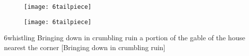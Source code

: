 \begin{a4}
	\begin{figure}[b!]
		\centering
		\texttt{[image: 6tailpiece]}
	\end{figure}
	\clearpage
\end{a4}

\begin{letter}
	\begin{figure}[b!]
		\centering
		\texttt{[image: 6tailpiece]}
	\end{figure}
\end{letter}


\begin{bwbigpic}
	[1.2] 
	{6whistling} 
	{Bringing down in crumbling ruin a portion of the gable of the house nearest the corner} 
	[Bringing down in crumbling ruin]
\end{bwbigpic}
